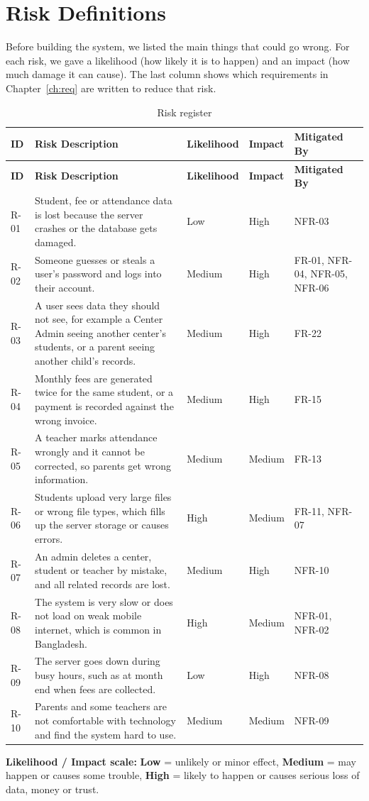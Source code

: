\section{Risk Definitions}\label{sec:risk}

Before building the system, we listed the main things that could go wrong.
For each risk, we gave a likelihood (how likely it is to happen) and an impact
(how much damage it can cause). The last column shows which requirements in
Chapter~\ref{ch:req} are written to reduce that risk.

\begin{longtable}{|L{1.2cm}|L{5.0cm}|L{1.8cm}|L{1.4cm}|L{3.3cm}|}
\caption{Risk register}\label{tab:risk}\\
\hline
{}\sffamily\bfseries ID & \sffamily\bfseries Risk Description & \sffamily\bfseries Likelihood & \sffamily\bfseries Impact & \sffamily\bfseries Mitigated By \\ \hline
\endfirsthead
\hline
{}\sffamily\bfseries ID & \sffamily\bfseries Risk Description & \sffamily\bfseries Likelihood & \sffamily\bfseries Impact & \sffamily\bfseries Mitigated By \\ \hline
\endhead
R-01 & Student, fee or attendance data is lost because the server crashes or the database gets damaged. & Low & High & NFR-03 \\ \hline
R-02 & Someone guesses or steals a user's password and logs into their account. & Medium & High & FR-01, NFR-04, NFR-05, NFR-06 \\ \hline
R-03 & A user sees data they should not see, for example a Center Admin seeing another center's students, or a parent seeing another child's records. & Medium & High & FR-22 \\ \hline
R-04 & Monthly fees are generated twice for the same student, or a payment is recorded against the wrong invoice. & Medium & High & FR-15 \\ \hline
R-05 & A teacher marks attendance wrongly and it cannot be corrected, so parents get wrong information. & Medium & Medium & FR-13 \\ \hline
R-06 & Students upload very large files or wrong file types, which fills up the server storage or causes errors. & High & Medium & FR-11, NFR-07 \\ \hline
R-07 & An admin deletes a center, student or teacher by mistake, and all related records are lost. & Medium & High & NFR-10 \\ \hline
R-08 & The system is very slow or does not load on weak mobile internet, which is common in Bangladesh. & High & Medium & NFR-01, NFR-02 \\ \hline
R-09 & The server goes down during busy hours, such as at month end when fees are collected. & Low & High & NFR-08 \\ \hline
R-10 & Parents and some teachers are not comfortable with technology and find the system hard to use. & Medium & Medium & NFR-09 \\ \hline
\end{longtable}

\noindent\textbf{Likelihood / Impact scale:} \textbf{Low} = unlikely or minor effect,
\textbf{Medium} = may happen or causes some trouble, \textbf{High} = likely to happen
or causes serious loss of data, money or trust.